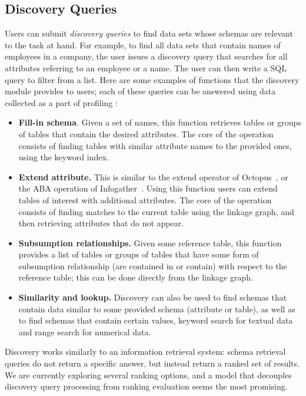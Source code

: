 \subsection{Discovery Queries}
\label{subsec:api}

Users can submit
\emph{discovery queries} to find data sets whose schemas are relevant to the
task at hand. For example, to find all data sets that contain names of employees
in a company, the user issues a discovery query that searches for all attributes
referring to an employee or a name. The user can then write a SQL query to filter
from a list. Here are some examples of functions that the discovery module
provides to users;  each of these queries can be answered using data collected
as a part of profiling :

\begin{itemize}
\item \textbf{Fill-in schema}. Given a set of names, this function retrieves 
tables or groups of tables that contain the desired attributes. The core
of the operation consists of finding tables with similar attribute names to the
provided ones, using the keyword index.

\item \textbf{Extend attribute.} This is similar to the extend operator of
Octopus~\cite{DBLP:journals/pvldb/CafarellaHK09}, or the ABA operation of
Infogather~\cite{DBLP:conf/sigmod/YakoutGCC12}. Using this function users can
extend tables of interest with additional attributes. The core of the operation
consists of finding matches to the current table using the linkage graph, and then retrieving 
attributes that do not appear.

\item \textbf{Subsumption relationships.} Given some reference table, this
function provides a list of tables or groups of tables that have some form of
subsumption relationship (\ie are contained in or contain) with respect to the
reference table;  this can be done directly from the linkage graph.

\item \textbf{Similarity and lookup.} Discovery can also be used to find schemas
that contain data similar to some provided schema (attribute or table), as well
as to find schemas that contain certain values, \ie keyword search for textual
data and range search for numerical data.  

\end{itemize}

Discovery works similarly to an information retrieval system: schema retrieval queries
do not return a specific answer, but instead return a ranked set of results. We
are currently exploring several ranking options, and a model that decouples
discovery query processing from ranking evaluation seems the most promising.


